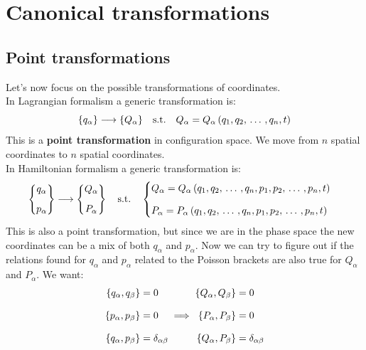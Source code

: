 \chapter{Canonical transformations}
\section{Point transformations}
Let's now focus on the possible transformations of coordinates.\\
In Lagrangian formalism a generic transformation is:
\begin{equation}
    \{q_{\alpha}\} \longrightarrow \{Q_{\alpha}\}\quad \text{s.t.}\quad Q_{\alpha} = Q_{\alpha}\left(q_1,q_2, \,\dots\, ,q_n,t\right)
\end{equation}
This is a \textbf{point transformation} in configuration space. We move from $n$ spatial coordinates to $n$ spatial coordinates.\\
In Hamiltonian formalism a generic transformation is:
\begin{equation}
    \begin{Bmatrix}
        q_{\alpha}\\[8pt]
        p_{\alpha}
    \end{Bmatrix} \longrightarrow
    \begin{Bmatrix}
        Q_{\alpha}\\[8pt]
        P_{\alpha}
    \end{Bmatrix}\quad \text{s.t.} \quad
    \begin{cases}
        Q_{\alpha} = Q_{\alpha}\left(q_1,q_2, \,\dots\, ,q_n,p_1,p_2, \,\dots\, ,p_n,t\right)\\[8pt]
        P_{\alpha} = P_{\alpha}\left(q_1,q_2, \,\dots\, ,q_n,p_1,p_2, \,\dots\, ,p_n,t\right)
    \end{cases}
\end{equation}
This is also a point transformation, but since we are in the phase space the new coordinates can be a mix of both $q_{\alpha}$ and $p_{\alpha}$. Now we can try to figure out if the relations found for $q_{\alpha}$ and $p_{\alpha}$ related to the Poisson brackets are also true for $Q_{\alpha}$ and $P_{\alpha}$.
We want:
\begin{equation}
    \begin{split}
        \pb{q_{\alpha}}{q_{\beta}} &= 0\\[8pt]
        \pb{p_{\alpha}}{p_{\beta}} &= 0\\[8pt]
        \pb{q_{\alpha}}{p_{\beta}} &= \delta_{\alpha \beta}
    \end{split} \implies
    \begin{split}
        \pb{Q_{\alpha}}{Q_{\beta}} &= 0\\[8pt]
        \pb{P_{\alpha}}{P_{\beta}} &= 0\\[8pt]
        \pb{Q_{\alpha}}{P_{\beta}} &= \delta_{\alpha \beta}
    \end{split}
\end{equation}
